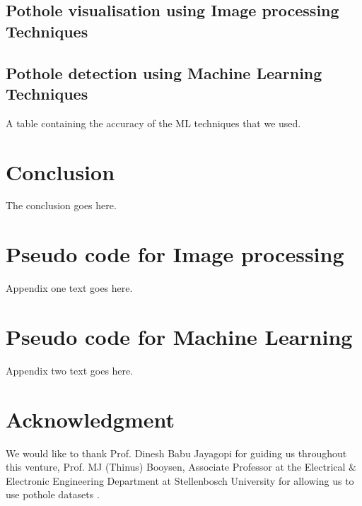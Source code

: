 \documentclass[journal]{IEEEtran}
\begin{document}
\subsection{Pothole visualisation using Image processing Techniques}



\subsection{Pothole detection using Machine Learning Techniques}


A table containing the accuracy of the ML techniques that we used.

\section{Conclusion}
The conclusion goes here.


\appendices
\section{Pseudo code for Image processing}
Appendix one text goes here.

\section{Pseudo code for Machine Learning}
Appendix two text goes here.


\section*{Acknowledgment}
We would like to thank Prof. Dinesh Babu Jayagopi for guiding us throughout this venture, Prof. MJ (Thinus) Booysen, Associate Professor at the Electrical $\&$ Electronic Engineering Department at Stellenbosch University for allowing us to use pothole datasets \cite{dataset}.


\ifCLASSOPTIONcaptionsoff
  \newpage
\fi
\end{document}
